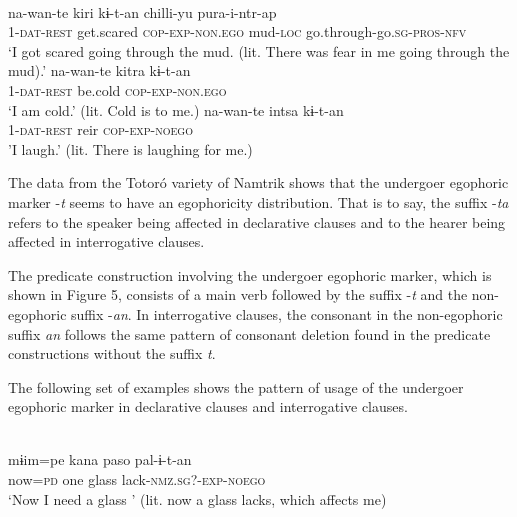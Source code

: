\documentclass[output=paper]{langsci/langscibook}
\begin{document}
\ea
{}\\ 
	\ea \label{ex:gg67a}
    \gll na-wan-te kiri kɨ-t-an chilli-yu pura-i-ntr-ap\\
         1-\textsc{dat-rest} get.scared \textsc{cop-exp-non.ego} mud-\textsc{loc} go.through-go.\textsc{sg-pros-nfv}\\
    \glt ‘I got scared going through the mud. (lit. There was fear in me going through the mud).’
  	\ex \label{ex:gg67b}
    \gll na-wan-te kitra kɨ-t-an\\
        1-\textsc{dat-rest}	be.cold	\textsc{cop-exp-non.ego}\\    
   	\glt ‘I am cold.’ (lit. Cold is to me.)
  	\ex \label{ex:gg67c}
  	\gll na-wan-te intsa kɨ-t-an\\
  	1-\textsc{dat-rest} reir \textsc{cop-exp-noego}\\
	\glt 'I laugh.' (lit. There is laughing for me.) 
\z \z

The data from the Totoró variety of Namtrik shows that the undergoer egophoric marker -\textit{t} seems to have an egophoricity distribution. That is to say, the suffix -\textit{ta} refers to the speaker being affected in declarative clauses and to the hearer being affected in interrogative clauses. 

The predicate construction involving the undergoer egophoric marker, which is shown in Figure 5, %
consists of a main verb followed by the suffix -\textit{t} and the non-egophoric suffix -\textit{an}. In interrogative clauses, the consonant in the non-egophoric suffix \textit{an} follows the same pattern of consonant deletion found in the predicate constructions without the suffix \textit{t}.


The following set of examples shows the pattern of usage of the undergoer egophoric marker in declarative clauses and interrogative clauses. 


\ea
{}\\ 
	\ea \label{ex:gg68a}
	\gll mɨim=pe kana paso pal-ɨ-t-an\\
	now=\textsc{pd}	one	glass lack-\textsc{nmz.sg?-exp-noego}\\
	\glt ‘Now I need a glass ’ (lit. now a glass lacks, which affects me)
	
\end{document}
